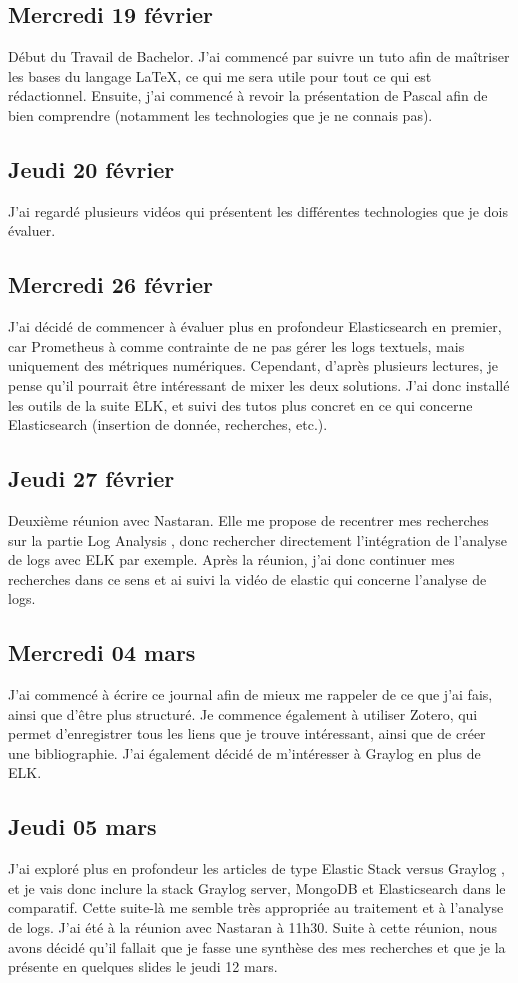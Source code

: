 \documentclass[paper=a4, fontsize=11pt]{scrartcl}
\begin{document}
\subsection{Mercredi 19 février}
    Début du Travail de Bachelor. J'ai commencé par suivre un tuto afin de maîtriser les bases du langage \LaTeX, ce qui me sera utile pour tout ce qui est rédactionnel. Ensuite, j'ai commencé à revoir la présentation de Pascal afin de bien comprendre (notamment les technologies que je ne connais pas).
\subsection{Jeudi 20 février}
    J'ai regardé plusieurs vidéos qui présentent les différentes technologies que je dois évaluer.
\subsection{Mercredi 26 février}
    J'ai décidé de commencer à évaluer plus en profondeur Elasticsearch en premier, car Prometheus à comme contrainte de ne pas gérer les logs textuels, mais uniquement des métriques numériques. Cependant, d'après plusieurs lectures, je pense qu'il pourrait être intéressant de mixer les deux solutions. J'ai donc installé les outils de la suite ELK, et suivi des tutos plus concret en ce qui concerne Elasticsearch (insertion de donnée, recherches, etc.).
\subsection{Jeudi 27 février}
    Deuxième réunion avec Nastaran. Elle me propose de recentrer mes recherches sur la partie \og Log Analysis \fg, donc rechercher directement l'intégration de l'analyse de logs avec ELK par exemple. Après la réunion, j'ai donc continuer mes recherches dans ce sens et ai suivi la vidéo de elastic qui concerne l'analyse de logs.
\subsection{Mercredi 04 mars}
    J'ai commencé à écrire ce journal afin de mieux me rappeler de ce que j'ai fais, ainsi que d'être plus structuré. Je commence également à utiliser Zotero, qui permet d'enregistrer tous les liens que je trouve intéressant, ainsi que de créer une bibliographie. J'ai également décidé de m'intéresser à Graylog en plus de ELK.
\subsection{Jeudi 05 mars}
    J'ai exploré plus en profondeur les articles de type \og Elastic Stack versus Graylog \fg, et je vais donc inclure la stack \og Graylog server, MongoDB et Elasticsearch \fg dans le comparatif. Cette suite-là me semble très appropriée au traitement et à l'analyse de logs.
    J'ai été à la réunion avec Nastaran à 11h30. Suite à cette réunion, nous avons décidé qu'il fallait que je fasse une synthèse des mes recherches et que je la présente en quelques slides le jeudi 12 mars.
\end{document}
